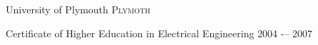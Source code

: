 \headedsection
  {University of Plymouth}
  {\textsc{Plymoth}}
  {%
  \headedsubsection
    {Certificate of Higher Education in Electrical Engineering}
    {2004 -– 2007}

}
